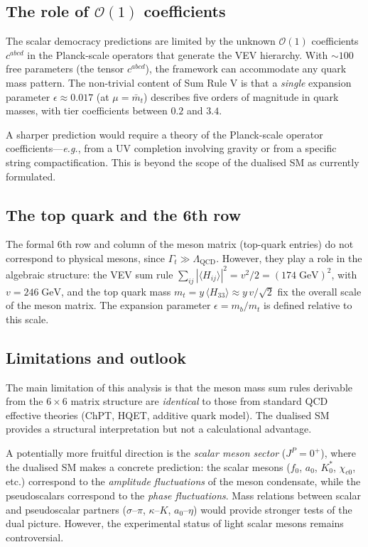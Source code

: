 \documentclass[11pt,a4paper]{article}
\newcommand{\QCD}{\ensuremath{\mathrm{QCD}}}
\newcommand{\eg}{\textit{e.g.}}
\newcommand{\LQCD}{\Lambda_{\QCD}}
\newcommand{\Ord}{\mathcal{O}}
\theoremstyle{plain}
\begin{document}
\subsection{The role of $\Ord(1)$ coefficients}

The scalar democracy predictions are limited by the unknown
$\Ord(1)$ coefficients $c^{abcd}$ in the Planck-scale operators that
generate the VEV hierarchy.  With $\sim 100$ free parameters (the
tensor $c^{abcd}$), the framework can accommodate any quark mass
pattern.  The non-trivial content of Sum Rule V is that a
\emph{single} expansion parameter $\epsilon \approx 0.017$ (at
$\mu = \bar{m}_t$) describes five orders of magnitude in quark masses,
with tier coefficients between $0.2$ and $3.4$.

A sharper prediction would require a theory of the Planck-scale
operator coefficients---\eg, from a UV completion involving gravity or
from a specific string compactification.  This is beyond the scope of
the dualised SM as currently formulated.

\subsection{The top quark and the 6th row}

The formal 6th row and column of the meson matrix (top-quark entries)
do not correspond to physical mesons, since $\Gamma_t \gg \LQCD$.
However, they play a role in the algebraic structure: the VEV sum rule
$\sum_{ij}|\langle H_{ij}\rangle|^2 = v^2/2 = (174\;\text{GeV})^2$, with
$v = 246\;\text{GeV}$, and the top quark mass
$m_t = y\,\langle H_{33}\rangle \approx y\,v/\sqrt{2}$ fix the overall
scale of the meson matrix.  The expansion parameter $\epsilon = m_b/m_t$ is defined
relative to this scale.

\subsection{Limitations and outlook}

The main limitation of this analysis is that the meson mass sum rules
derivable from the $6 \times 6$ matrix structure are \emph{identical}
to those from standard QCD effective theories (ChPT, HQET, additive
quark model).  The dualised SM provides a structural interpretation but
not a calculational advantage.

A potentially more fruitful direction is the \emph{scalar meson sector}
($J^P = 0^+$), where the dualised SM makes a concrete prediction: the
scalar mesons ($f_0$, $a_0$, $K_0^*$, $\chi_{c0}$, etc.) correspond to
the \emph{amplitude fluctuations} of the meson condensate, while the
pseudoscalars correspond to the \emph{phase fluctuations}.  Mass
relations between scalar and pseudoscalar partners
($\sigma$--$\pi$, $\kappa$--$K$, $a_0$--$\eta$) would provide
stronger tests of the dual picture.  However, the experimental status of
light scalar mesons remains controversial.
\end{document}
